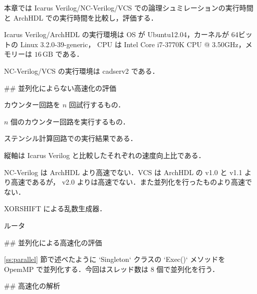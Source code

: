 本章では Icarus Verilog/NC-Verilog/VCS での論理シュミレーションの実行時間と
ArchHDL での実行時間を比較し，評価する．

Icarus Verilog/ArchHDL の実行環境は OS が Ubuntu12.04，カーネルが 64ビットの
Linux 3.2.0-39-generic， CPU は
Intel Core i7-3770K CPU @ 3.50GHz，メモリーは
$16\,\mathrm{GB}$ である．

NC-Verilog/VCS の実行環境は cadserv2 である．


## 並列化によらない高速化の評価

カウンター回路を $n$ 回試行するもの．

$n$ 個のカウンター回路を実行するもの．

ステンシル計算回路での実行結果である．

縦軸は Icarus Verilog と比較したそれぞれの速度向上比である．

NC-Verilog は ArchHDL より高速でない．VCS は ArchHDL の v1.0 と v1.1 より高速であるが， v2.0 よりは高速でない．また並列化を行ったものより高速でない．





XORSHIFT による乱数生成器．




ルータ





## 並列化による高速化の評価

\ref{ss:parallel} 節で述べたように `Singleton` クラスの `Exec()`
メソッドを OpemMP で並列化する．今回はスレッド数は 8 個で並列化を行う．







## 高速化の解析







